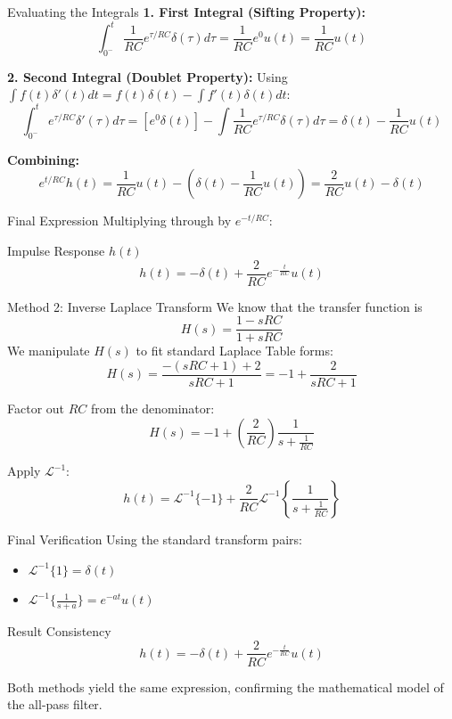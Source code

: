 \documentclass{beamer}
\begin{document}
\begin{frame}{ Evaluating the Integrals}
    \textbf{1. First Integral (Sifting Property):}
    $$\int_{0^-}^t \frac{1}{RC}e^{\tau/RC}\delta(\tau)d\tau = \frac{1}{RC} e^0 u(t) = \frac{1}{RC}u(t)$$
    \par\vspace{0.3cm}
    \textbf{2. Second Integral (Doublet Property):}
    Using $\int f(t)\delta'(t)dt = f(t)\delta(t) - \int f'(t)\delta(t)dt$:
    $$\int_{0^-}^t e^{\tau/RC}\delta'(\tau)d\tau = [e^0 \delta(t)] - \int \frac{1}{RC} e^{\tau/RC}\delta(\tau)d\tau = \delta(t) - \frac{1}{RC}u(t)$$
    \par\vspace{0.3cm}
    \textbf{Combining:}
    $$e^{t/RC} h(t) = \frac{1}{RC}u(t) - \left( \delta(t) - \frac{1}{RC}u(t) \right) = \frac{2}{RC}u(t) - \delta(t)$$
\end{frame}

\begin{frame}{ Final Expression}
    Multiplying through by $e^{-t/RC}$:
    \begin{block}{Impulse Response $h(t)$}
        $$h(t) = -\delta(t) + \frac{2}{RC} e^{-\frac{t}{RC}} u(t)$$
    \end{block}
\end{frame}



\begin{frame}{Method 2: Inverse Laplace Transform}
We know that the transfer function is
$$H(s) = \frac{1-sRC }{1+sRC}$$
    We manipulate $H(s)$ to fit standard Laplace Table forms:
    $$H(s) = \frac{-(sRC + 1) + 2}{sRC + 1} = -1 + \frac{2}{sRC + 1}$$
    \par\vspace{0.3cm}
    Factor out $RC$ from the denominator:
    $$H(s) = -1 + \left( \frac{2}{RC} \right) \frac{1}{s + \frac{1}{RC}}$$
    \par\vspace{0.3cm}
    Apply $\mathcal{L}^{-1}$:
    $$h(t) = \mathcal{L}^{-1} \{-1\} + \frac{2}{RC} \mathcal{L}^{-1} \left\{ \frac{1}{s + \frac{1}{RC}} \right\}$$
\end{frame}

\begin{frame}{ Final Verification}
    Using the standard transform pairs:
    \begin{itemize}
        \item $\mathcal{L}^{-1}\{1\} = \delta(t)$
        \item $\mathcal{L}^{-1}\{\frac{1}{s+a}\} = e^{-at}u(t)$
    \end{itemize}
    \par\vspace{0.4cm}
    \begin{block}{Result Consistency}
        $$h(t) = -\delta(t) + \frac{2}{RC} e^{-\frac{t}{RC}} u(t)$$
    \end{block}
    \vfill
    Both methods yield the same expression, confirming the mathematical model of the all-pass filter.
\end{frame}
\end{document}

